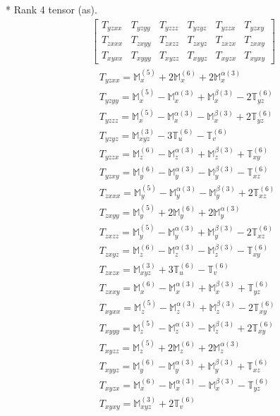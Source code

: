 \documentclass[fleqn,8pt,landscape]{jsarticle}
\begin{document}
* Rank 4 tensor (as).
\begin{align*}
\begin{bmatrix} T_{yzxx} & T_{yzyy} & T_{yzzz} & T_{yzyz} & T_{yzzx} & T_{yzxy} \\ T_{zxxx} & T_{zxyy} & T_{zxzz} & T_{zxyz} & T_{zxzx} & T_{zxxy} \\ T_{xyxx} & T_{xyyy} & T_{xyzz} & T_{xyyz} & T_{xyzx} & T_{xyxy} \end{bmatrix}
\end{align*}
\begin{align*}
& T_{yzxx} = \mathbb{M}_{x}^{(5)} + 2 \mathbb{M}_{x}^{(6)} + 2 \mathbb{M}_{x}^{\alpha(3)} \\
& T_{yzyy} = \mathbb{M}_{x}^{(5)} - \mathbb{M}_{x}^{\alpha(3)} + \mathbb{M}_{x}^{\beta(3)} - 2 \mathbb{T}_{yz}^{(6)} \\
& T_{yzzz} = \mathbb{M}_{x}^{(5)} - \mathbb{M}_{x}^{\alpha(3)} - \mathbb{M}_{x}^{\beta(3)} + 2 \mathbb{T}_{yz}^{(6)} \\
& T_{yzyz} = \mathbb{M}_{xyz}^{(3)} - 3 \mathbb{T}_{u}^{(6)} - \mathbb{T}_{v}^{(6)} \\
& T_{yzzx} = \mathbb{M}_{z}^{(6)} - \mathbb{M}_{z}^{\alpha(3)} + \mathbb{M}_{z}^{\beta(3)} + \mathbb{T}_{xy}^{(6)} \\
& T_{yzxy} = \mathbb{M}_{y}^{(6)} - \mathbb{M}_{y}^{\alpha(3)} - \mathbb{M}_{y}^{\beta(3)} - \mathbb{T}_{xz}^{(6)} \\
& T_{zxxx} = \mathbb{M}_{y}^{(5)} - \mathbb{M}_{y}^{\alpha(3)} - \mathbb{M}_{y}^{\beta(3)} + 2 \mathbb{T}_{xz}^{(6)} \\
& T_{zxyy} = \mathbb{M}_{y}^{(5)} + 2 \mathbb{M}_{y}^{(6)} + 2 \mathbb{M}_{y}^{\alpha(3)} \\
& T_{zxzz} = \mathbb{M}_{y}^{(5)} - \mathbb{M}_{y}^{\alpha(3)} + \mathbb{M}_{y}^{\beta(3)} - 2 \mathbb{T}_{xz}^{(6)} \\
& T_{zxyz} = \mathbb{M}_{z}^{(6)} - \mathbb{M}_{z}^{\alpha(3)} - \mathbb{M}_{z}^{\beta(3)} - \mathbb{T}_{xy}^{(6)} \\
& T_{zxzx} = \mathbb{M}_{xyz}^{(3)} + 3 \mathbb{T}_{u}^{(6)} - \mathbb{T}_{v}^{(6)} \\
& T_{zxxy} = \mathbb{M}_{x}^{(6)} - \mathbb{M}_{x}^{\alpha(3)} + \mathbb{M}_{x}^{\beta(3)} + \mathbb{T}_{yz}^{(6)} \\
& T_{xyxx} = \mathbb{M}_{z}^{(5)} - \mathbb{M}_{z}^{\alpha(3)} + \mathbb{M}_{z}^{\beta(3)} - 2 \mathbb{T}_{xy}^{(6)} \\
& T_{xyyy} = \mathbb{M}_{z}^{(5)} - \mathbb{M}_{z}^{\alpha(3)} - \mathbb{M}_{z}^{\beta(3)} + 2 \mathbb{T}_{xy}^{(6)} \\
& T_{xyzz} = \mathbb{M}_{z}^{(5)} + 2 \mathbb{M}_{z}^{(6)} + 2 \mathbb{M}_{z}^{\alpha(3)} \\
& T_{xyyz} = \mathbb{M}_{y}^{(6)} - \mathbb{M}_{y}^{\alpha(3)} + \mathbb{M}_{y}^{\beta(3)} + \mathbb{T}_{xz}^{(6)} \\
& T_{xyzx} = \mathbb{M}_{x}^{(6)} - \mathbb{M}_{x}^{\alpha(3)} - \mathbb{M}_{x}^{\beta(3)} - \mathbb{T}_{yz}^{(6)} \\
& T_{xyxy} = \mathbb{M}_{xyz}^{(3)} + 2 \mathbb{T}_{v}^{(6)}
\end{align*}
\end{document}
